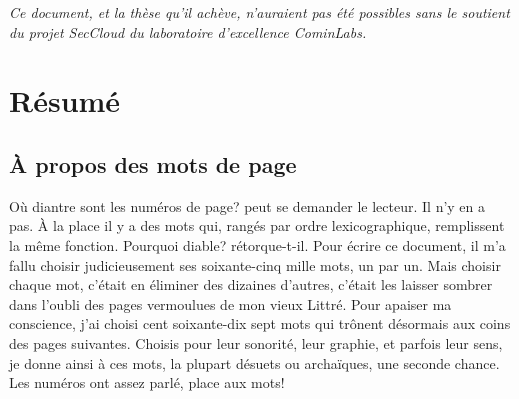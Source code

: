 \cleartorecto
\begin{minipage}{26pc}
\itshape Ce document, et la thèse qu'il achève, n'auraient pas été possibles
sans le soutient du projet SecCloud du laboratoire d'excellence CominLabs.
\end{minipage}
\vfill
\begin{minipage}{26pc}
\section*{Résumé}

\end{minipage}
\vfill
\phantom{a}

\cleartoverso
\tableofcontents*

\vfill

\begin{minipage}{0.8\textwidth}
\subsection*{À propos des mots de page}
\og Où diantre sont les numéros de page?\fg{} peut se demander le lecteur.  Il n'y en
a pas.  À la place il y a des mots qui, rangés par ordre lexicographique,
remplissent la même fonction.  \og Pourquoi diable?\fg{} rétorque-t-il.  Pour
écrire ce document, il m'a fallu choisir judicieusement ses soixante-cinq mille
mots, un par un.  Mais choisir chaque mot, c'était en éliminer des dizaines
d'autres, c'était les laisser sombrer dans l'oubli des pages vermoulues de mon
vieux Littré.  Pour apaiser ma conscience, j'ai choisi cent soixante-dix sept
mots qui trônent désormais aux coins des pages suivantes.  Choisis pour leur
sonorité, leur graphie, et parfois leur sens, je donne ainsi à ces mots, la
plupart désuets ou archaïques, une seconde chance.  Les numéros ont assez parlé,
place aux mots!
\end{minipage}
\restoregeometry

\mainmatter
\pagestyle{companion}


\backmatter

\printbibliography
\restoregeometry



